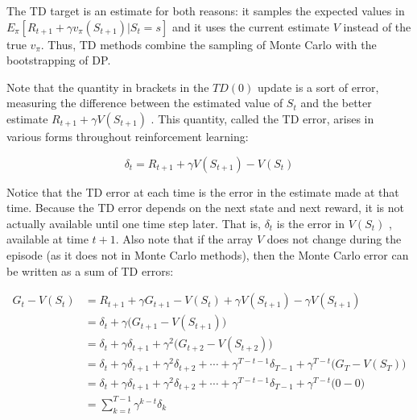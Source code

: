 \documentclass{article}
\begin{document}
The TD target is an estimate for both reasons: it samples the expected values in $ E _ { \pi } [ R _ { t + 1 } + \gamma v _ { \pi } ( S _ { t + 1 } ) | S _ { t } = s ] $ and 
it uses the current estimate $V$ instead of the true $v _ { \pi }$. Thus, TD methods combine the sampling of Monte Carlo with the bootstrapping of DP.

Note that the quantity in brackets in the $TD(0)$ update is a sort of error, measuring the difference between the estimated value of $S _ { t }$ and 
the better estimate $R _ { t + 1 } + \gamma V ( S _ { t + 1 } )$ . This quantity, called the TD error, arises in various forms throughout reinforcement learning:

$$
\delta _ { t } = R _ { t + 1 } + \gamma V ( S _ { t + 1 } ) - V ( S _ { t } )
$$

Notice that the TD error at each time is the error in the estimate made at that time. Because the TD error depends on the next state and next reward, 
it is not actually available until one time step later. That is, $\delta _ { t }$ is the error in $V ( S _ { t } )$ , available at time $t + 1$. 
Also note that if the array $V$ does not change during the episode (as it does not in Monte Carlo methods), then the Monte Carlo error can be written as a sum of TD errors:

$$
\begin{aligned} { G _ { t } - V ( S _ { t } ) } & { { } = R _ { t + 1 } + \gamma G _ { t + 1 } - V ( S _ { t } ) + \gamma V ( S _ { t + 1 } ) - \gamma V ( S _ { t + 1 } ) } \\ { } & { { } = \delta _ { t } + \gamma \big ( G _ { t + 1 } - V ( S _ { t + 1 } ) \big ) } \\ { } & { { } = \delta _ { t } + \gamma \delta _ { t + 1 } + \gamma ^ { 2 } \big ( G _ { t + 2 } - V ( S _ { t + 2 } ) \big ) } \\ { } & { { } = \delta _ { t } + \gamma \delta _ { t + 1 } + \gamma ^ { 2 } \delta _ { t + 2 } + \cdots + \gamma ^ { T - t - 1 } \delta _ { T - 1 } + \gamma ^ { T - t } \big ( G _ { T } - V ( S _ { T } ) \big ) } \\ { } & { { } = \delta _ { t } + \gamma \delta _ { t + 1 } + \gamma ^ { 2 } \delta _ { t + 2 } + \cdots + \gamma ^ { T - t - 1 } \delta _ { T - 1 } + \gamma ^ { T - t } \big ( 0 - 0 \big ) } \\ { } & { { } = \sum _ { k = t } ^ { T - 1 } \gamma ^ { k - t } \delta _ { k } } \\ \end{aligned}
$$
\end{document}
